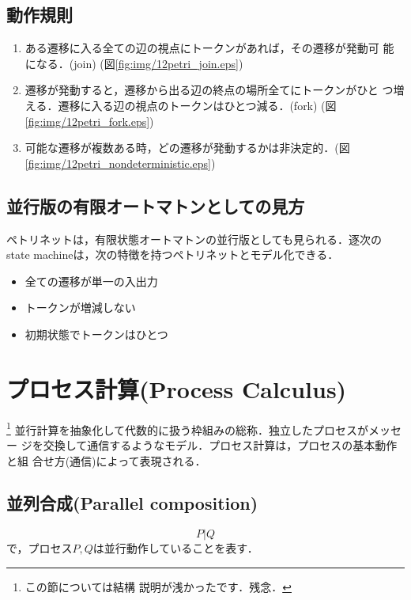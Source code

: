 \subsection{動作規則}


\begin{enumerate}
 \item ある遷移に入る全ての辺の視点にトークンがあれば，その遷移が発動可
       能になる．(join) (図\ref{fig:img/12petri_join.eps})
 \item 遷移が発動すると，遷移から出る辺の終点の場所全てにトークンがひと
       つ増える．遷移に入る辺の視点のトークンはひとつ減る．(fork) (図
       \ref{fig:img/12petri_fork.eps})
 \item 可能な遷移が複数ある時，どの遷移が発動するかは非決定的．(図\ref{fig:img/12petri_nondeterministic.eps})
\end{enumerate}

\subsection{並行版の有限オートマトンとしての見方}
ペトリネットは，有限状態オートマトンの並行版としても見られる．逐次の
state machineは，次の特徴を持つペトリネットとモデル化できる．
\begin{itemize}
 \item 全ての遷移が単一の入出力
 \item トークンが増減しない
 \item 初期状態でトークンはひとつ
\end{itemize}


\section{プロセス計算(Process Calculus)} \footnote{この節については結構
説明が浅かったです．残念．}
並行計算を抽象化して代数的に扱う枠組みの総称．独立したプロセスがメッセー
ジを交換して通信するようなモデル．プロセス計算は，プロセスの基本動作と組
合せ方(通信)によって表現される．

\subsection{並列合成(Parallel composition)}
\[
 P | Q
\]
で，プロセス$P, Q$は並行動作していることを表す．

